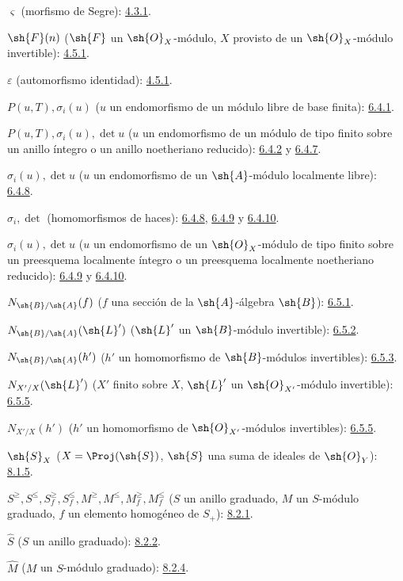 \documentclass[oneside,10pt]{amsart}
\renewcommand{\leq}{\leqslant}
\renewcommand{\geq}{\geqslant}
\begin{document}
$\varsigma$ (morfismo de Segre): \hyperref[II.4.3.1]{4.3.1}.

$\sh{F}(n)$ ($\sh{F}$ un $\sh{O}_X$-módulo, $X$ provisto de un
$\sh{O}_X$-módulo invertible): \hyperref[II.4.5.1]{4.5.1}.

$\varepsilon$ (automorfismo identidad): \hyperref[II.4.5.1]{4.5.1}.

$P(u,T),\sigma_i(u)$ ($u$ un endomorfismo de un módulo libre de base finita): \hyperref[II.6.4.1]{6.4.1}.

$P(u,T),\sigma_i(u),\det u$
($u$ un endomorfismo de un módulo de tipo finito sobre un anillo íntegro o un
anillo noetheriano reducido): \hyperref[II.6.4.2]{6.4.2} y \hyperref[II.6.4.7]{6.4.7}.

$\sigma_i(u),\det u$ ($u$ un endomorfismo de un $\sh{A}$-módulo localmente libre): \hyperref[II.6.4.8]{6.4.8}.

$\sigma_i,\det$ (homomorfismos de haces): \hyperref[II.6.4.8]{6.4.8}, \hyperref[II.6.4.9]{6.4.9} y \hyperref[II.6.4.10]{6.4.10}.

$\sigma_i(u),\det u$
($u$ un endomorfismo de un $\sh{O}_X$-módulo de tipo finito sobre un preesquema
localmente íntegro o un preesquema localmente noetheriano reducido):
\hyperref[II.6.4.9]{6.4.9} y \hyperref[II.6.4.10]{6.4.10}.

$N_{\sh{B}/\sh{A}}(f)$
($f$ una sección de la $\sh{A}$-álgebra $\sh{B}$): \hyperref[II.6.5.1]{6.5.1}.

$N_{\sh{B}/\sh{A}}(\sh{L}')$
($\sh{L}'$ un $\sh{B}$-módulo invertible): \hyperref[II.6.5.2]{6.5.2}.

$N_{\sh{B}/\sh{A}}(h')$
($h'$ un homomorfismo de $\sh{B}$-módulos invertibles): \hyperref[II.6.5.3]{6.5.3}.

$N_{X'/X}(\sh{L}')$
($X'$ finito sobre $X$, $\sh{L}'$ un $\sh{O}_{X'}$-módulo invertible): \hyperref[II.6.5.5]{6.5.5}.

$N_{X'/X}(h')$
($h'$ un homomorfismo de $\sh{O}_{X'}$-módulos invertibles): \hyperref[II.6.5.5]{6.5.5}.

$\sh{S}_X$ ($X=\Proj(\sh{S})$, $\sh{S}$ una suma de ideales de
$\sh{O}_Y$): \hyperref[II.8.1.5]{8.1.5}.

$S^\geq,S^\leq,S_f^\geq,S_f^\leq,
M^\geq,M^\leq,M_f^\geq,M_f^\leq$
($S$ un anillo graduado, $M$ un $S$-módulo graduado,
$f$ un elemento homogéneo de $S_+$): \hyperref[II.8.2.1]{8.2.1}.

$\widehat S$ ($S$ un anillo graduado): \hyperref[II.8.2.2]{8.2.2}.

$\widehat M$ ($M$ un $S$-módulo graduado): \hyperref[II.8.2.4]{8.2.4}.
\end{document}
